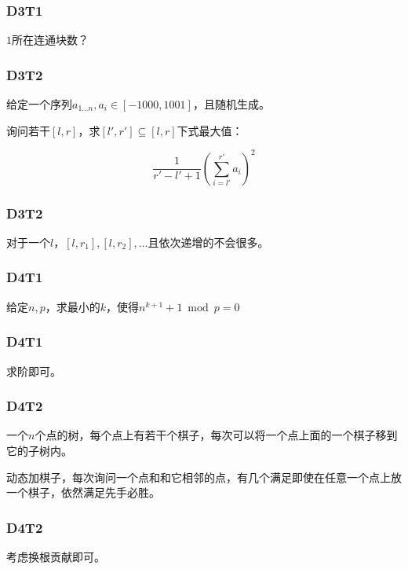 \documentclass[10pt]{beamer}
\begin{document}
	\clearpage
	\begin{frame}
		\frametitle{D3T1}
	
		$1$所在连通块数？
	
	\end{frame}
	\clearpage
	\begin{frame}
		\frametitle{D3T2}
	
		给定一个序列$a_{1\dots n},a_i\in[-1000,1001]$，且随机生成。

		询问若干$[l,r]$，求$[l',r']\subseteq [l,r]$下式最大值：

		$$
		\dfrac{1}{r'-l'+1}(\sum_{i=l'}^{r'} a_i)^2
		$$
	
	\end{frame}
	\clearpage
	\begin{frame}
		\frametitle{D3T2}
	
		对于一个$l$，$[l,r_1],[l,r_2],\dots$且依次递增的不会很多。
	
	\end{frame}
	\clearpage
	\begin{frame}
		\frametitle{D4T1}
	
		给定$n,p$，求最小的$k$，使得$n^{k+1}+1\bmod p=0$
	
	\end{frame}
	\clearpage
	\begin{frame}
		\frametitle{D4T1}
	
		求阶即可。
	
	\end{frame}
	\clearpage
	\begin{frame}
		\frametitle{D4T2}
	
		一个$n$个点的树，每个点上有若干个棋子，每次可以将一个点上面的一个棋子移到它的子树内。

		动态加棋子，每次询问一个点和和它相邻的点，有几个满足即使在任意一个点上放一个棋子，依然满足先手必胜。
	
	\end{frame}
	\clearpage
	\begin{frame}
		\frametitle{D4T2}
	
		考虑换根贡献即可。
	
	\end{frame}
\end{document}
